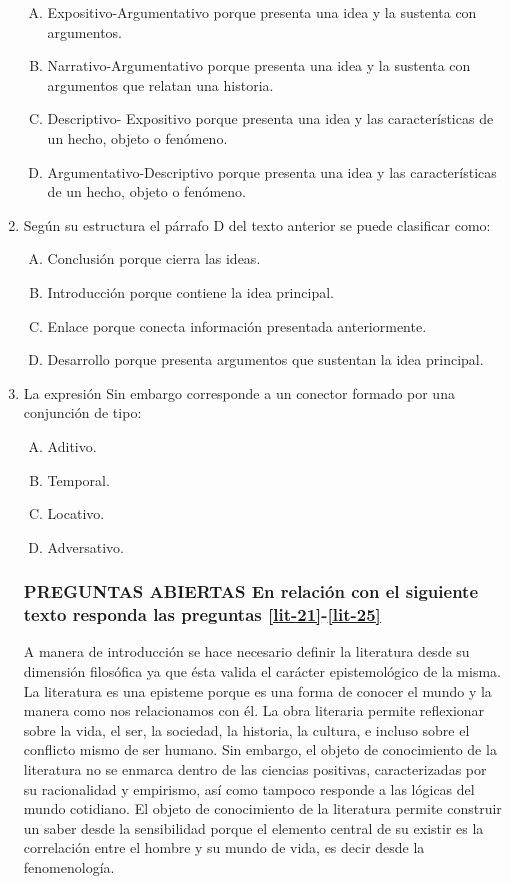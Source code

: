\begin{enumerate}
\begin{enumerate}[(A)]
\item  Expositivo-Argumentativo porque presenta una idea y la sustenta con argumentos.
\item   Narrativo-Argumentativo porque presenta una idea y la sustenta con argumentos que relatan una historia. 
\item  Descriptivo- Expositivo porque presenta una idea y las características de un hecho, objeto o fenómeno.
\item  Argumentativo-Descriptivo porque presenta una idea y las características de un hecho, objeto o fenómeno.
\end{enumerate}
\item Según su estructura el párrafo D del texto anterior se puede clasificar como:\label{lit-19}

\begin{enumerate}[(A)]
\item  Conclusión porque cierra las ideas.
\item  Introducción porque contiene la idea principal.
\item  Enlace porque conecta información presentada anteriormente.
\item  Desarrollo porque presenta argumentos que sustentan la idea principal.
\end{enumerate}
\newpage
\item  La expresión Sin embargo corresponde a un conector formado por una conjunción de tipo: \label{lit-20}


\begin{enumerate}[(A)]
\item  Aditivo.
\item  Temporal.
\item  Locativo.
\item  Adversativo.
\end{enumerate}

\subsubsection*{\textbf{PREGUNTAS ABIERTAS}
En relación con el siguiente texto responda las preguntas \ref{lit-21}-\ref{lit-25}}

A manera de introducción se hace necesario definir la literatura desde su dimensión filosófica ya que ésta valida el carácter epistemológico de la misma. La literatura es una episteme porque es una forma de conocer el mundo y la manera como nos relacionamos con él. La obra literaria permite reflexionar sobre la vida, el ser, la sociedad, la historia, la cultura, e incluso sobre el conflicto mismo de ser humano. Sin embargo, el objeto de conocimiento de la literatura no se enmarca dentro de las ciencias positivas,  caracterizadas por su racionalidad y empirismo, así como tampoco responde a las lógicas del mundo cotidiano. El objeto de conocimiento de la literatura permite construir un saber desde la sensibilidad  porque el elemento central  de su existir es la correlación entre el hombre y su mundo de vida, es decir desde la fenomenología.



\end{enumerate}
